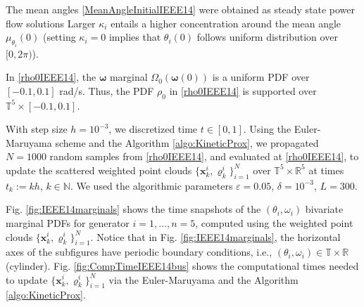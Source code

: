 \documentclass[10pt,twocolumn]{IEEEtran}
\newcommand{\red}{\color{red}}
\begin{document}
The mean angles \eqref{MeanAngleInitialIEEE14} were obtained as steady state power flow solutions {\red{for the generator phase angles with constant load?? Please complete/edit this sentence}} Larger $\kappa_{i}$ entails a higher concentration around the mean angle $\mu_{\theta_{i}}(0)$ (setting $\kappa_i=0$ implies that $\theta_{i}(0)$ follows uniform distribution over $[0,2\pi)$).

In \eqref{rho0IEEE14}, the $\bm{\omega}$ marginal $ \Omega_{0}\left(\bm{\omega}(0)\right)$ is a uniform PDF over $[-0.1,0.1]$ rad/s. Thus, the PDF $\rho_0$ in \eqref{rho0IEEE14} is supported over $\mathbb{T}^{5}\times [-0.1,0.1]$.

With step size $h=10^{-3}$, we discretized time $t\in[0,1]$. Using the Euler-Maruyama scheme and the Algorithm \ref{algo:KineticProx}, we propagated $N=1000$ random samples from \eqref{rho0IEEE14}, and evaluated at \eqref{rho0IEEE14}, to update the scattered weighted point clouds $\{\bm{x}_{k}^{i},\varrho_{k}^{i}\}_{i=1}^{N}$ over $\mathbb{T}^{5}\times\mathbb{R}^{5}$ at times $t_{k}:=kh$, $k\in\mathbb{N}$. We used the algorithmic parameters $\varepsilon=0.05$, $\delta=10^{-3}$, $L=300$.

Fig. \ref{fig:IEEE14marginals} shows the time snapshots of the $(\theta_{i},\omega_{i})$ bivariate marginal PDFs for generator $i=1,\hdots, n=5$, computed using the weighted point clouds $\{\bm{x}_{k}^{i},\varrho_{k}^{i}\}_{i=1}^{N}$. Notice that in Fig. \ref{fig:IEEE14marginals}, the horizontal axes of the subfigures have periodic boundary conditions, i.e., $(\theta_{i},\omega_{i})\in\mathbb{T}\times\mathbb{R}$ (cylinder). Fig. \ref{fig:CompTimeIEEE14bus} shows the computational times needed to update $\{\bm{x}_{k}^{i},\varrho_{k}^{i}\}_{i=1}^{N}$ via the Euler-Maruyama and the Algorithm \ref{algo:KineticProx}.  
\end{document}

